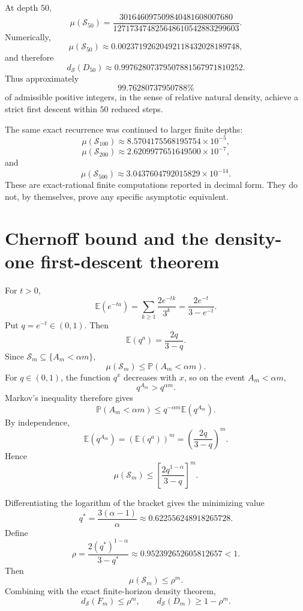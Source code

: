 \documentclass[11pt]{article}
\theoremstyle{definition}
\theoremstyle{remark}
\newcommand{\Sset}{\mathcal S}
\newcommand{\Prob}{\mathbb P}
\newcommand{\E}{\mathbb E}
\newcommand{\ds}{d_{\Sset}}
\begin{document}
At depth $50$,
\begin{equation}
\boxed{
\mu(\mathcal S_{50})
=
\frac{301646097509840481608007680}
{127173474825648610542883299603}.
}
\label{eq:mu50exact}
\end{equation}
Numerically,
\[
\mu(\mathcal S_{50})
\approx0.00237192620492118432028189748,
\]
and therefore
\begin{equation}
\boxed{
\ds(D_{50})
\approx0.99762807379507881567971810252.
}
\label{eq:D50}
\end{equation}
Thus approximately
\[
\boxed{99.76280737950788\%}
\]
of admissible positive integers, in the sense of relative natural density, achieve a strict first descent within $50$ reduced steps.

The same exact recurrence was continued to larger finite depths:
\[
\mu(\mathcal S_{100})
\approx8.5704175568195754\times10^{-5},
\]
\[
\mu(\mathcal S_{200})
\approx2.6209977651649500\times10^{-7},
\]
and
\[
\mu(\mathcal S_{500})
\approx3.0437604792015829\times10^{-14}.
\]
These are exact-rational finite computations reported in decimal form.  They do not, by themselves, prove any specific asymptotic equivalent.

\section{Chernoff bound and the density-one first-descent theorem}
\label{sec:densityone}

For $t>0$,
\[
\E(e^{-ta})
=
\sum_{k\ge1}\frac{2e^{-tk}}{3^k}
=
\frac{2e^{-t}}{3-e^{-t}}.
\]
Put $q=e^{-t}\in(0,1)$.  Then
\[
\E(q^a)=\frac{2q}{3-q}.
\]
Since $\mathcal S_m\subseteq\{A_m<\alpha m\}$,
\[
\mu(\mathcal S_m)
\le
\Prob(A_m<\alpha m).
\]
For $q\in(0,1)$, the function $q^x$ decreases with $x$, so on the event $A_m<\alpha m$,
\[
q^{A_m}>q^{\alpha m}.
\]
Markov's inequality therefore gives
\[
\Prob(A_m<\alpha m)
\le
q^{-\alpha m}\E(q^{A_m}).
\]
By independence,
\[
\E(q^{A_m})
=
\left(\E(q^a)\right)^m
=
\left(\frac{2q}{3-q}\right)^m.
\]
Hence
\begin{equation}
\boxed{
\mu(\mathcal S_m)
\le
\left[
\frac{2q^{1-\alpha}}{3-q}
\right]^m.
}
\label{eq:chernoff-general}
\end{equation}

Differentiating the logarithm of the bracket gives the minimizing value
\begin{equation}
\boxed{
q^\ast=\frac{3(\alpha-1)}{\alpha}
\approx0.622556248918265728.
}
\label{eq:qstar}
\end{equation}
Define
\begin{equation}
\boxed{
\rho=
\frac{2(q^\ast)^{1-\alpha}}{3-q^\ast}
\approx0.952392652605812657<1.
}
\label{eq:rho}
\end{equation}
Then
\begin{equation}
\boxed{\mu(\mathcal S_m)\le\rho^m.}
\label{eq:rho-bound}
\end{equation}
Combining with the exact finite-horizon density theorem,
\begin{equation}
\boxed{
\ds(F_m)\le\rho^m,
\qquad
\ds(D_m)\ge1-\rho^m.
}
\label{eq:density-bound}
\end{equation}
\end{document}
